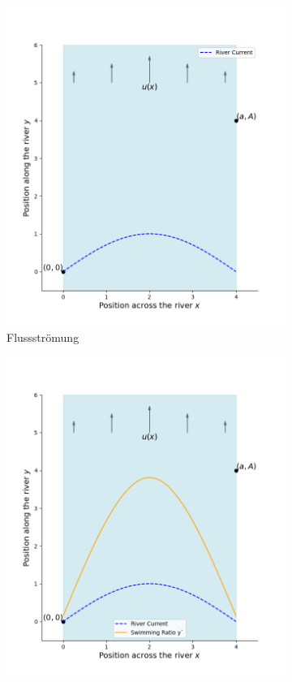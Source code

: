 \begin{figure}
    \centering
    \begin{subfigure}{0.48\textwidth}
        \centering
        \includegraphics[width=\textwidth]{papers/schwimmen/Grafiken/Figure_2.png}	
        \caption{Flussströmung}
        \label{fig:no_velocity}
    \end{subfigure}
    \hfill  
    \begin{subfigure}{0.48\textwidth}
        \centering
        \includegraphics[width=\textwidth]{papers/schwimmen/Grafiken/Figure_3.png}	

\end{subfigure}
\end{figure}
